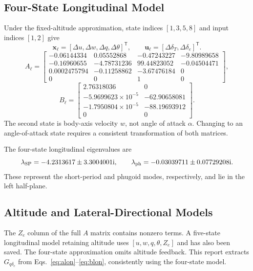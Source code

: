 \documentclass[a4paper,11pt]{article}
\newcommand{\de}{\delta_e}
\newcommand{\dt}{\delta_T}
\newcommand{\Gq}{G_{q\delta_e}}
\begin{document}
\subsection{Four-State Longitudinal Model}
Under the fixed-altitude approximation, state indices $[1,3,5,8]$ and input indices $[1,2]$ give
\begin{equation}
\bm x_\ell=[\Delta u,\Delta w,\Delta q,\Delta\theta]^{\mathsf T},\qquad
\bm u_\ell=[\Delta\dt,\Delta\de]^{\mathsf T}.
\end{equation}
\begin{equation}\label{eq:alon}
A_\ell=\begin{bmatrix}
-0.06144334&0.05552868&-0.47243227&-9.80989658\\
-0.16960655&-4.78731236&99.44823052&-0.04504471\\
0.0002475794&-0.11258862&-3.67476184&0\\
0&0&1&0
\end{bmatrix},
\end{equation}
\begin{equation}\label{eq:blon}
B_\ell=\begin{bmatrix}
2.76318036&0\\
-5.9699623\times10^{-5}&-62.90658081\\
-1.7950804\times10^{-5}&-88.19693912\\
0&0
\end{bmatrix}.
\end{equation}
The second state is body-axis velocity $w$, not angle of attack $\alpha$. Changing to an angle-of-attack state requires a consistent transformation of both matrices.

The four-state longitudinal eigenvalues are
\begin{equation}
\lambda_{\rm SP}=-4.2313617\pm3.3004001\mathrm i,\qquad
\lambda_{\rm ph}=-0.03039711\pm0.07729208\mathrm i.
\end{equation}
These represent the short-period and phugoid modes, respectively, and lie in the left half-plane.

\subsection{Altitude and Lateral-Directional Models}
The $Z_e$ column of the full $A$ matrix contains nonzero terms. A five-state longitudinal model retaining altitude uses $[u,w,q,\theta,Z_e]$ and has also been saved. The four-state approximation omits altitude feedback. This report extracts $\Gq$ from Eqs.~\eqref{eq:alon}--\eqref{eq:blon}, consistently using the four-state model.
\end{document}
